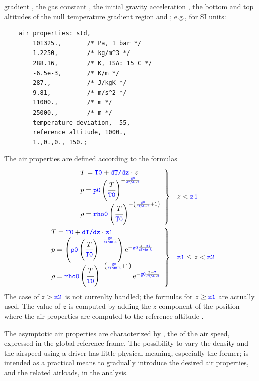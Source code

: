gradient , the gas constant , the
initial gravity acceleration , the bottom and top
altitudes of the null temperature gradient region  and
; e.g., for SI units:
\begin{verbatim}
    air properties: std,
        101325.,       /* Pa, 1 bar */
        1.2250,        /* kg/m^3 */
        288.16,        /* K, ISA: 15 C */
        -6.5e-3,       /* K/m */
        287.,          /* J/kgK */
        9.81,          /* m/s^2 */
        11000.,        /* m */
        25000.,        /* m */
        temperature deviation, -55,
        reference altitude, 1000.,
        1.,0.,0., 150.;
\end{verbatim}
The air properties are defined according to the formulas
\begin{subequations}
\begin{align}
	\left. \begin{array}{l} 
		T = \textcolor{blue}{\texttt{T0}} + \textcolor{blue}{\texttt{dT/dz}} \cdot z
		\\
		p = \textcolor{blue}{\texttt{p0}} \left( \cfrac{T}{\textcolor{blue}{\texttt{T0}}} \right)^{-\frac{\textcolor{blue}{\texttt{g0}}}{\textcolor{blue}{\texttt{dT/dz}} \cdot \textcolor{blue}{\texttt{R}}}}
		\\
		\rho = \textcolor{blue}{\texttt{rho0}} \left( \cfrac{T}{\textcolor{blue}{\texttt{T0}}} \right)^{-\left( \frac{\textcolor{blue}{\texttt{g0}}}{\textcolor{blue}{\texttt{dT/dz}} \cdot \textcolor{blue}{\texttt{R}}} + 1 \right)}
	 \end{array} \right\}
	&&& z < \textcolor{blue}{\texttt{z1}}
	\\
	\left. \begin{array}{l} 
		T = \textcolor{blue}{\texttt{T0}} + \textcolor{blue}{\texttt{dT/dz}} \cdot \textcolor{blue}{\texttt{z1}}
		\\
		p = \left( \textcolor{blue}{\texttt{p0}}\left( \cfrac{T}{\textcolor{blue}{\texttt{T0}}} \right)^{-\frac{\textcolor{blue}{\texttt{g0}}}{\textcolor{blue}{\texttt{dT/dz}} \cdot \textcolor{blue}{\texttt{R}}}} \right)
			\mathrm{e}^{-\textcolor{blue}{\texttt{g0}} \frac{z - \textcolor{blue}{\texttt{z1}}}{\textcolor{blue}{\texttt{dT/dz}} \cdot \textcolor{blue}{\texttt{R}}}}
		\\
		\rho = \textcolor{blue}{\texttt{rho0}} \left( \cfrac{T}{\textcolor{blue}{\texttt{T0}}} \right)^{-\left( \frac{\textcolor{blue}{\texttt{g0}}}{\textcolor{blue}{\texttt{dT/dz}} \cdot \textcolor{blue}{\texttt{R}}} + 1 \right)}
			\mathrm{e}^{-\textcolor{blue}{\texttt{g0}} \frac{z - \textcolor{blue}{\texttt{z1}}}{\textcolor{blue}{\texttt{dT/dz}} \cdot \textcolor{blue}{\texttt{R}}}}
	 \end{array} \right\}
	&&& \textcolor{blue}{\texttt{z1}} \le z < \textcolor{blue}{\texttt{z2}}
\end{align}
\end{subequations}
The case of $z > \textcolor{blue}{\texttt{z2}}$ is not currenlty handled;
the formulas for $z \ge \textcolor{blue}{\texttt{z1}}$ are actually used.
The value of $z$ is computed by adding the $z$ component
of the position where the air properties are computed
to the reference altitude .

The asymptotic air properties are characterized by ,
the  of the air speed,
expressed in the global reference frame.
The possibility to vary the density and the airspeed using a driver
has little physical meaning, especially the former;
is intended as a practical means to gradually introduce
the desired air properties, and the related airloads, in the analysis.


